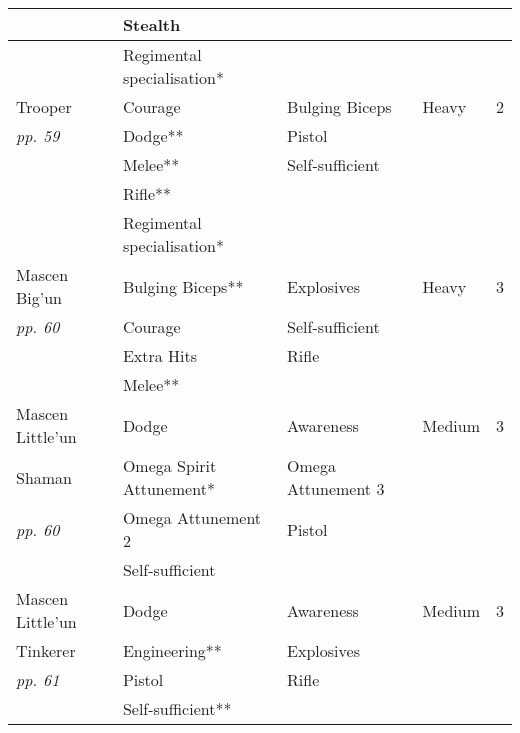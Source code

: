 \documentclass{scrbook}
\begin{document}
\begin{table}
\begin{tabular}{|l|l|l|l|l|}
 \hline  & Stealth &  &  &  \\
 \hline  & Regimental specialisation* &  &  &  \\
 \hline Trooper & Courage & Bulging Biceps & Heavy & 2 \\
 \hline \textit{pp. 59} & Dodge** & Pistol &  &  \\
 \hline  & Melee** & Self-sufficient &  &  \\
 \hline  & Rifle** &  &  &  \\
 \hline  & Regimental specialisation* &  &  &  \\
 \hline Mascen Big'un & Bulging Biceps** & Explosives & Heavy & 3 \\
 \hline \textit{pp. 60} & Courage & Self-sufficient &  &  \\
 \hline  & Extra Hits & Rifle &  &  \\
 \hline  & Melee** &  &  &  \\
 \hline Mascen Little'un & Dodge & Awareness & Medium & 3 \\
 \hline Shaman & Omega Spirit Attunement* & Omega Attunement 3 &  &  \\
 \hline \textit{pp. 60} & Omega Attunement 2 & Pistol &  &  \\
 \hline  & Self-sufficient &  &  &  \\
 \hline Mascen Little'un & Dodge & Awareness & Medium & 3 \\
 \hline Tinkerer & Engineering** & Explosives &  &  \\
 \hline \textit{pp. 61} & Pistol & Rifle &  &  \\
 \hline  & Self-sufficient** &  &  &  \\
 \hline \end{tabular}

\end{table}
\end{document}
